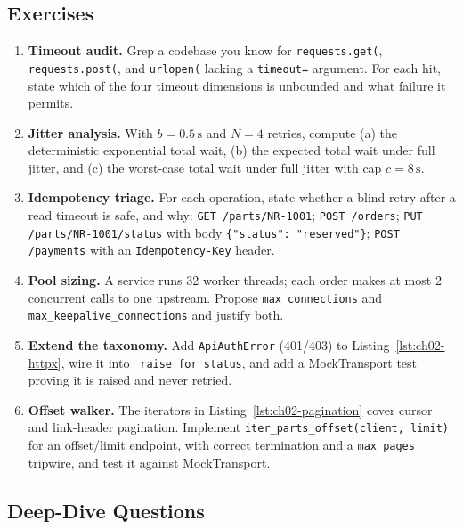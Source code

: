 \subsection{Exercises}

\begin{enumerate}
  \item \textbf{Timeout audit.} Grep a codebase you know for
        \texttt{requests.get(}, \texttt{requests.post(}, and
        \texttt{urlopen(} lacking a \texttt{timeout=} argument. For each hit,
        state which of the four timeout dimensions is unbounded and what
        failure it permits.
  \item \textbf{Jitter analysis.} With $b = 0.5\,\text{s}$ and $N = 4$
        retries, compute (a) the deterministic exponential total wait,
        (b) the expected total wait under full jitter, and (c) the worst-case
        total wait under full jitter with cap $c = 8\,\text{s}$.
  \item \textbf{Idempotency triage.} For each operation, state whether a
        blind retry after a read timeout is safe, and why:
        \texttt{GET /parts/NR-1001}; \texttt{POST /orders};
        \texttt{PUT /parts/NR-1001/status} with body
        \texttt{\{"status": "reserved"\}}; \texttt{POST /payments} with an
        \texttt{Idempotency-Key} header.
  \item \textbf{Pool sizing.} A service runs 32 worker threads; each order
        makes at most 2 concurrent calls to one upstream. Propose
        \texttt{max\_connections} and \texttt{max\_keepalive\_connections}
        and justify both.
  \item \textbf{Extend the taxonomy.} Add \texttt{ApiAuthError} (401/403) to
        Listing~\ref{lst:ch02-httpx}, wire it into
        \texttt{\_raise\_for\_status}, and add a MockTransport test proving
        it is raised and never retried.
  \item \textbf{Offset walker.} The iterators in
        Listing~\ref{lst:ch02-pagination} cover cursor and link-header
        pagination. Implement \texttt{iter\_parts\_offset(client, limit)}
        for an offset/limit endpoint, with correct termination and a
        \texttt{max\_pages} tripwire, and test it against MockTransport.
\end{enumerate}

\subsection{Deep-Dive Questions}


